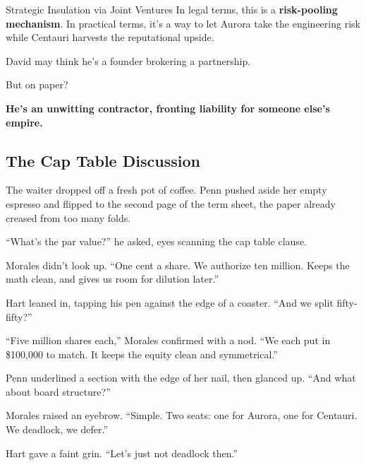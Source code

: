 \begin{TechnicalSidebar}{Strategic Insulation via Joint Ventures}
  In legal terms, this is a \textbf{risk-pooling mechanism}. In practical terms, it’s a way to let Aurora take the engineering 
  risk while Centauri harvests the reputational upside.
  
  \medskip
  
  David may think he’s a founder brokering a partnership.

  \medskip
  
  But on paper?

  \medskip
  
  \textbf{He’s an unwitting contractor, fronting liability for someone else’s empire.}
  
\end{TechnicalSidebar}


\medskip

\subsection{The Cap Table Discussion}

The waiter dropped off a fresh pot of coffee. Penn pushed aside her empty espresso and flipped to the second page of the 
term sheet, the paper already creased from too many folds.

``What’s the par value?'' he asked, eyes scanning the cap table clause.

Morales didn’t look up. ``One cent a share. We authorize ten million. Keeps the math clean, and gives us room for 
dilution later.''

Hart leaned in, tapping his pen against the edge of a coaster. ``And we split fifty-fifty?''

``Five million shares each,'' Morales confirmed with a nod. ``We each put in \$100,000 to match. It keeps the equity 
clean and symmetrical.''

Penn underlined a section with the edge of her nail, then glanced up. ``And what about board structure?''

Morales raised an eyebrow. ``Simple. Two seats: one for Aurora, one for Centauri. We deadlock, we defer.''

Hart gave a faint grin. ``Let’s just not deadlock then.''


